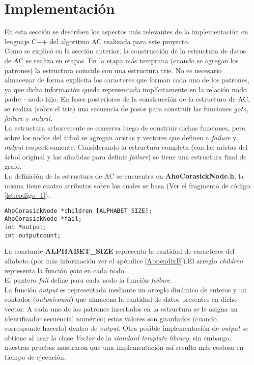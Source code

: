 {\section{Implementación}
En esta sección se describen los aspectos más relevantes de la implementación en lenguaje C++ del algoritmo AC realizada para este proyecto. \\
Como se explicó en la sección anterior, la construcción de la estructura de datos de AC se realiza en etapas. En la etapa más temprana (cuando se agregan los patrones) la estructura coincide con una estructura trie. No es necesario almacenar de forma explícita los caracteres que forman cada uno de los patrones, ya que dicha información queda representada implícitamente en la relación nodo padre - nodo hijo. En fases posteriores de la construcción de la estructura de AC, se realiza (sobre el trie) una secuencia de pasos para construir las funciones {\it goto}, {\it failure} y {\it output}.\\
La estructura arborescente se conserva luego de construir dichas funciones, pero sobre los nodos del árbol se agregan aristas y vectores que definen a {\it failure} y {\it output} respectivamente. Considerando la estructura completa (con las aristas del árbol original y las añadidas para definir {\it failure}) se tiene una estructura final de grafo.\\
La definición de la estructura de AC se encuentra en {\bf AhoCorasickNode.h}, la misma tiene cuatro atributos sobre los cuales se basa (Ver el fragmento de código {\ref{lst:codigo_1}}).
\begin{lstlisting}[caption=Representación de los nodos en AC, label={lst:codigo_1}]
AhoCorasickNode *children [ALPHABET_SIZE];
AhoCorasickNode *fail;
int *output;
int outputcount;
\end{lstlisting}
La constante {\bf ALPHABET\_SIZE} representa la cantidad de caracteres del alfabeto (por más información ver el apéndice \ref{AppendixB}).El arreglo  {\it children} representa la función {\it goto} en cada nodo.\\
El puntero {\it fail} define para cada nodo la función {\it failure}. \\
La función {\it output} es representada mediante un arreglo dinámico de enteros y un contador ({\it outputcount}) que almacena la cantidad de datos presentes en dicho vector. A cada uno de los patrones insertados en la estructura se le asigna un identificador secuencial numérico; estos valores son guardados (cuando corresponde hacerlo) dentro de {\it output}. Otra posible implementación de {\it output} se obtiene al usar la clase {\it Vector} de la {\it standard template library}, sin embargo, nuestras pruebas mostraron que una implementación así resulta más costosa en tiempo de ejecución. \\
}
